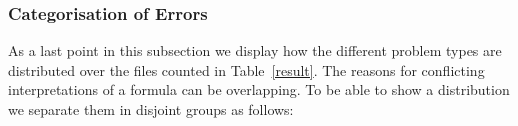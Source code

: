 \subsubsection{Categorisation of Errors}
As a last point in this subsection we display how the different problem types are distributed over the files counted in Table~\ref{result}.   
The reasons for conflicting interpretations of a formula 
can be overlapping. 
% 
%
To be able to show a distribution we separate them in disjoint groups as follows: 
